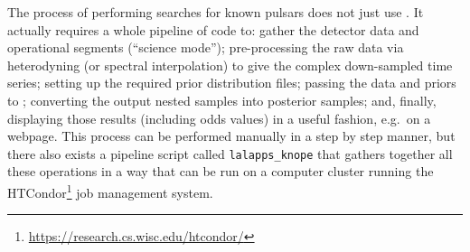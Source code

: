 The process of performing searches for known pulsars does not just use \lppen. It actually requires a whole pipeline of code to: gather the \gw detector
data and operational segments (``science mode'');  pre-processing the raw data via heterodyning (or spectral interpolation) to give the complex down-sampled
time series; setting up the required prior distribution files; passing the data and priors to \lppen; converting the output nested samples into posterior samples;
and, finally, displaying those results (including odds values) in a useful fashion, e.g.\ on a webpage. This process can be performed manually in a step by step
manner, but there also exists a pipeline script called {\tt lalapps\_knope} that gathers together all these operations in a way that can be run on a computer
cluster running the HTCondor\footnote{\url{https://research.cs.wisc.edu/htcondor/}} job management system.

